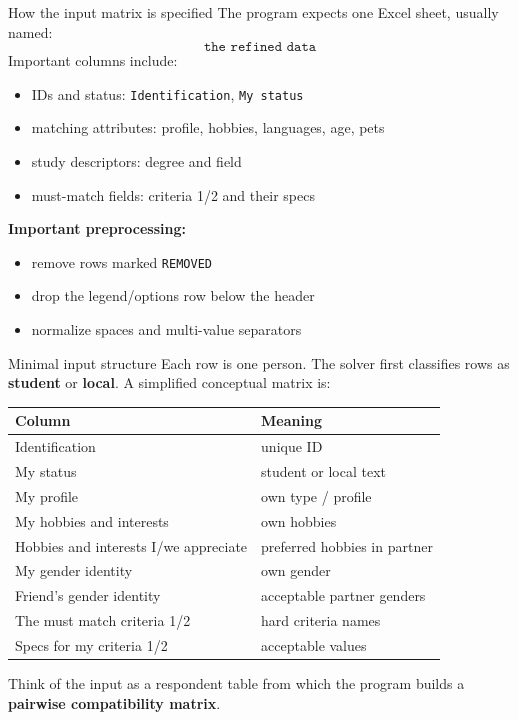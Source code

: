 \documentclass[aspectratio=169]{beamer}
\begin{document}
\begin{frame}{How the input matrix is specified}
The program expects one Excel sheet, usually named:
\[
\texttt{the refined data}
\]
Important columns include:
\begin{itemize}
  \item IDs and status: \texttt{Identification}, \texttt{My status}
  \item matching attributes: profile, hobbies, languages, age, pets
  \item study descriptors: degree and field
  \item must-match fields: criteria 1/2 and their specs
\end{itemize}

\textbf{Important preprocessing:}
\begin{itemize}
  \item remove rows marked \texttt{REMOVED}
  \item drop the legend/options row below the header
  \item normalize spaces and multi-value separators
\end{itemize}
\end{frame}

\begin{frame}[fragile]{Minimal input structure}
Each row is one person. The solver first classifies rows as \textbf{student} or \textbf{local}.
A simplified conceptual matrix is:

\begin{center}
\begin{tabular}{>{\ttfamily}p{2.5cm} p{8.2cm}}
\toprule
Column & Meaning \\
\midrule
Identification & unique ID \\
My status & student or local text \\
My profile & own type / profile \\
My hobbies and interests & own hobbies \\
Hobbies and interests I/we appreciate & preferred hobbies in partner \\
My gender identity & own gender \\
Friend's gender identity & acceptable partner genders \\
The must match criteria 1/2 & hard criteria names \\
Specs for my criteria 1/2 & acceptable values \\
\bottomrule
\end{tabular}
\end{center}

Think of the input as a respondent table from which the program builds a \textbf{pairwise compatibility matrix}.
\end{frame}
\end{document}
